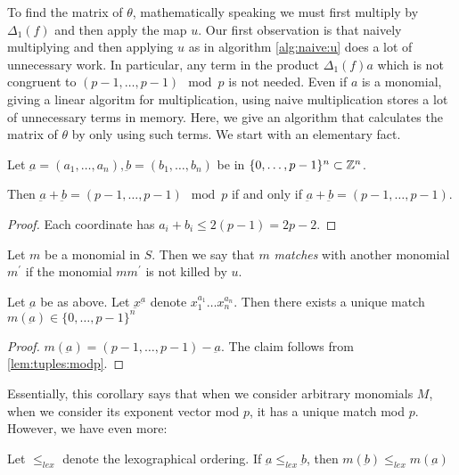
To find the matrix of \(\theta\), mathematically
speaking we must first multiply by \(\Delta_{1}(f)\) 
and then apply the map \(u\).
Our first observation is that naively 
multiplying and then applying \(u\) 
as in algorithm \ref{alg:naive:u}
does a lot of unnecessary work.
In particular, any term in the 
product \(\Delta_{1}(f)a\) which 
is not congruent to 
\((p-1, \ldots, p-1) \mod p\)
is not needed. 
Even if \(a\) is a monomial, giving a linear
algoritm for multiplication, using naive
multiplication stores a lot of unnecessary terms
in memory.
Here, we give an algorithm that calculates
the matrix of \(\theta\) by only
using such terms.
We start with an elementary fact.

\begin{lem}
	\label{lem:tuples:modp}
	Let \(\underbar{a} = (a_{1}, \ldots, a_{n}),
	\underbar{b} = (b_{1}, \ldots, b_{n})\)
	be in \(\{0, \ldots, p-1\}^{n} \subset \mathbb{Z}^{n}\).

	Then \(\underbar{a} + \underbar{b} = 
	(p-1, \ldots, p-1) \mod p\)
	if and only if 
	\(\underbar{a} + \underbar{b} = 
	(p-1, \ldots, p-1)\).
\end{lem}

\begin{proof}
	Each coordinate has \(a_{i} + b_{i} \leq 2(p-1) = 2p-2\).
\end{proof}

\begin{defn}
	Let \(m\) be a monomial in \(S\). 
	Then we say that \(m\) \textit{matches}
	with another monomial \(m^{\prime}\) 
	if the monomial \(mm^{\prime}\) is
	not killed by \(u\).
\end{defn}

\begin{cor}
	Let \(\underbar{a}\) be as above.
	Let \(\underbar{x}^{\underbar{a}}\)
	denote \(x_{1}^{a_{1}} \ldots x_{n}^{a_{n}}\).
	Then there exists a unique
	match \(m(\underbar{a}) \in \{0, \ldots, p-1\}^{n}\) 
\end{cor}

\begin{proof}
	\(m(\underbar{a}) = 
	(p-1, \ldots, p-1) - \underbar{a}\).
	The claim follows from 
	\ref{lem:tuples:modp}.
\end{proof}

Essentially, this corollary says that
when we consider arbitrary monomials \(M\),
when we consider its exponent vector 
mod \(p\), it has a unique
match mod \(p\).
However, we have even more:

\begin{cor}
	\label{cor:match:order}
	Let \(\leq_{lex}\) denote the 
	lexographical ordering.
	If \(\underbar{a} \leq_{lex} \underbar{b}\),
	then 
	\(m(\underbar{b}) \leq_{lex} m(\underbar{a})\)
\end{cor}

